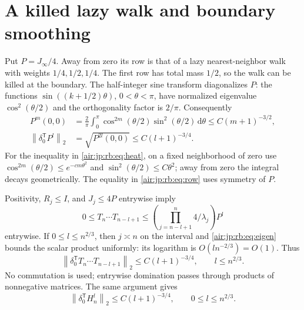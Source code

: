 \documentclass[11pt,letterpaper]{article}
\numberwithin{equation}{section}
\theoremstyle{remark}
\newcommand{\norm}[1]{\left\lVert#1\right\rVert}
\begin{document}
\section{A killed lazy walk and boundary smoothing}\label{air:jp:rb:sec:smoothing}

Put $P=J_\infty/4$. Away from zero its row is that of a lazy nearest-neighbor walk with weights $1/4,1/2,1/4$. The first row has total mass $1/2$, so the walk can be killed at the boundary. The half-integer sine transform diagonalizes $P$: the functions
$\sin((k+1/2)\theta)$, $0<\theta<\pi$, have normalized eigenvalue $\cos^2(\theta/2)$ and the orthogonality factor is $2/\pi$. Consequently
\begin{align}
 P^m(0,0)
 &=\frac2\pi\int_0^\pi\cos^{2m}(\theta/2)\sin^2(\theta/2)\,\mathrm d\theta
 \le C(m+1)^{-3/2},\label{air:jp:rb:eq:heat}\\
 \norm{\delta_0^{\mathsf T}P^l}_2
 &=\sqrt{P^{2l}(0,0)}\le C(l+1)^{-3/4}.\label{air:jp:rb:eq:row}
\end{align}
For the inequality in \eqref{air:jp:rb:eq:heat}, on a fixed neighborhood of zero use
$\cos^{2m}(\theta/2)\le e^{-cm\theta^2}$ and $\sin^2(\theta/2)\le C\theta^2$; away from zero the integral decays geometrically. The equality in \eqref{air:jp:rb:eq:row} uses symmetry of $P$.

Positivity, $R_j\le I$, and $J_j\le4P$ entrywise imply
\[
 0\le T_n\cdots T_{n-l+1}
 \le\left(\prod_{j=n-l+1}^n4/\lambda_j\right)P^l
\]
entrywise. If $0\le l\le n^{2/3}$, then $j\asymp n$ on the interval and \eqref{air:jp:rb:eq:eigen} bounds the scalar product uniformly: its logarithm is $O(ln^{-2/3})=O(1)$. Thus
\begin{equation}\label{air:jp:rb:eq:smoothing}
 \norm{\delta_0^{\mathsf T}T_n\cdots T_{n-l+1}}_2
 \le C(l+1)^{-3/4},\qquad l\le n^{2/3}.
\end{equation}
No commutation is used; entrywise domination passes through products of nonnegative matrices. The same argument gives
\begin{equation}\label{air:jp:rb:eq:frozen-smoothing}
 \norm{\delta_0^{\mathsf T}H_n^l}_2\le C(l+1)^{-3/4},
 \qquad 0\le l\le n^{2/3}.
\end{equation}
\end{document}
